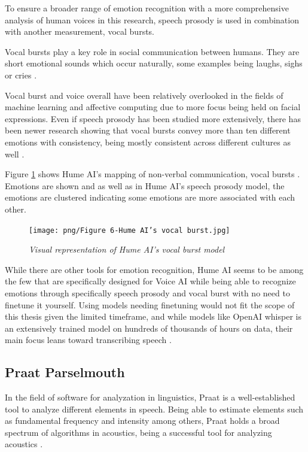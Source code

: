  To ensure a broader range of emotion recognition with a more comprehensive analysis of human voices in this research, speech prosody is used in combination with another measurement, vocal bursts.

Vocal bursts play a key role in social communication between humans. They are short emotional sounds which occur naturally, some examples being laughs, sighs or cries \autocite{Brooks2023}.

Vocal burst and voice overall have been relatively overlooked in the fields of machine learning and affective computing due to more focus being held on facial expressions. Even if speech prosody has been studied more extensively, there has been newer research showing that vocal bursts convey more than ten different emotions with consistency, being mostly consistent across different cultures as well \autocite{Baird2022}.

 Figure \ref{fig:hume-ai-vocal-burst} shows Hume AI’s mapping of non-verbal communication, vocal bursts \autocite{HumeAIVocalExpression}. Emotions are shown and as well as in Hume AI’s speech prosody model, the emotions are clustered indicating some emotions are more associated with each other.

\begin{figure}[ht]
    \centering
    \texttt{[image: png/Figure 6-Hume AI’s vocal burst.jpg]}
    \caption{\textit{Visual representation of Hume AI’s vocal burst model} \autocite{HumeAIVocalExpression}}
    \label{fig:hume-ai-vocal-burst}
\end{figure}

 While there are other tools for emotion recognition, Hume AI seems to be among the few that are specifically designed for Voice AI while being able to recognize emotions through specifically speech prosody and vocal burst with no need to finetune it yourself. Using models needing finetuning would not fit the scope of this thesis given the limited timeframe, and while models like OpenAI whisper is an extensively trained model on hundreds of thousands of hours on data, their main focus leans toward transcribing speech \autocite{OpenAI2022}.

\subsection{Praat Parselmouth}

In the field of software for analyzation in linguistics, Praat is a well-established tool to analyze different elements in speech. Being able to estimate elements such as fundamental frequency and intensity among others, Praat holds a broad spectrum of algorithms in acoustics, being a successful tool for analyzing acoustics \autocite{Jadoul2024}.

